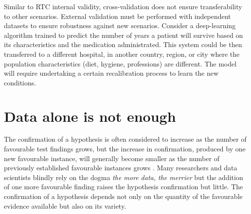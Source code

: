 \documentclass[
]{book}
\begin{document}
Similar to RTC internal validity, cross-validation does not ensure transferability to other scenarios. External validation must be performed with independent datasets to ensure robustness against new scenarios. Consider a deep-learning algorithm trained to predict the number of years a patient will survive based on its characteristics and the medication administrated. This system could be then transferred to a different hospital, in another country, region, or city where the population characteristics (diet, hygiene, professions) are different. The model will require undertaking a certain recalibration process to learn the new conditions.

\hypertarget{data-is-not-enough}{%
\section{Data alone is not enough}\label{data-is-not-enough}}

The confirmation of a hypothesis is often considered to increase as the number of favourable test findings grows, but the increase in confirmation, produced by one new favourable instance, will generally become smaller as the number of previously established favourable instances grows \citep{hempel-pos}. Many researchers and data scientists blindly rely on the dogma \emph{the more data, the merrier} but the addition of one more favourable finding raises the hypothesis confirmation but little. The confirmation of a hypothesis depends not only on the quantity of the favourable evidence available but also on its variety.
\end{document}
